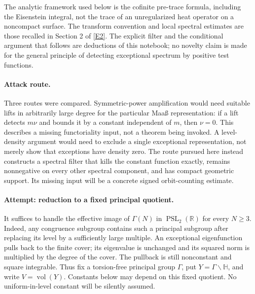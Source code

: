 \documentclass[11pt]{article}
\newcommand{\R}{\mathbb{R}}
\newcommand{\eref}[2]{\hyperlink{extra:#1:#2}{[E#2]}}
\begin{document}
The analytic framework used below is the cofinite pre-trace formula, including
the Eisenstein integral, not the trace of an unregularized heat operator on a
noncompact surface. The transform convention and local spectral estimates are
those recalled in Section 2 of \eref{101}{2}. The explicit filter and the
conditional argument that follows are deductions of this notebook; no novelty
claim is made for the general principle of detecting exceptional spectrum by
positive test functions.

\paragraph{Attack route.}
Three routes were compared. Symmetric-power amplification would need suitable
lifts in arbitrarily large degree for the particular Maa\ss{} representation:
if a lift detects $m\nu$ and bounds it by a constant independent of $m$, then
$\nu=0$. This describes a missing functoriality input, not a theorem being
invoked. A level-density argument would need to exclude a single exceptional
representation, not merely show that exceptions have density zero. The route
pursued here instead constructs a spectral filter that kills the constant
function exactly, remains nonnegative on every other spectral component, and
has compact geometric support. Its missing input will be a concrete signed
orbit-counting estimate.

\paragraph{Attempt: reduction to a fixed principal quotient.}
It suffices to handle the effective image of $\Gamma(N)$ in
$\operatorname{PSL}_2(\R)$ for every $N\ge3$. Indeed, any congruence subgroup
contains such a principal subgroup after replacing its level by a sufficiently
large multiple. An exceptional eigenfunction pulls back to the finite cover;
its eigenvalue is unchanged and its squared norm is multiplied by the degree
of the cover. The pullback is still nonconstant and square integrable. Thus
fix a torsion-free principal group $\Gamma$, put
$Y=\Gamma\backslash\mathbb H$, and write $V=\operatorname{vol}(Y)$.
Constants below may depend on this fixed quotient. No uniform-in-level
constant will be silently assumed.
\end{document}
